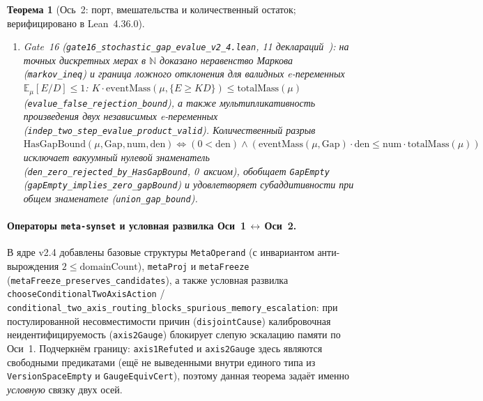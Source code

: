\documentclass[11pt,a4paper]{article}
\theoremstyle{preprintthm}
\newtheorem{theorem}{Теорема}[section]
\theoremstyle{preprintdef}
\begin{document}
\begin{theorem}[Ось~2: порт, вмешательства и количественный остаток; верифицировано в Lean~4.36.0]
\begin{enumerate}
  \item \emph{Gate~16 (\texttt{gate16\_\allowbreak stochastic\_\allowbreak gap\_\allowbreak evalue\_\allowbreak v2\_\allowbreak 4.lean}, 11 деклараций~\cite{strand2026g16}):} на точных дискретных мерах в $\mathbb{N}$ доказано неравенство Маркова (\texttt{markov\_\allowbreak ineq}) и граница ложного отклонения для валидных e-переменных $\mathbb{E}_\mu[E/D]\le 1$: $K\cdot\mathrm{eventMass}(\mu,\{E\ge KD\})\le\mathrm{totalMass}(\mu)$ (\texttt{evalue\_\allowbreak false\_\allowbreak rejection\_\allowbreak bound}), а также мультипликативность произведения двух независимых e-переменных (\texttt{indep\_\allowbreak two\_\allowbreak step\_\allowbreak evalue\_\allowbreak product\_\allowbreak valid}). Количественный разрыв $\mathrm{HasGapBound}(\mu,\mathrm{Gap},\mathrm{num},\mathrm{den}) \iff (0 < \mathrm{den}) \land (\mathrm{eventMass}(\mu,\mathrm{Gap})\cdot\mathrm{den} \le \mathrm{num}\cdot\mathrm{totalMass}(\mu))$ исключает вакуумный нулевой знаменатель (\texttt{den\_\allowbreak zero\_\allowbreak rejected\_\allowbreak by\_\allowbreak HasGapBound}, 0~аксиом), обобщает \texttt{GapEmpty} (\texttt{gapEmpty\_\allowbreak implies\_\allowbreak zero\_\allowbreak gapBound}) и удовлетворяет субаддитивности при общем знаменателе (\texttt{union\_\allowbreak gap\_\allowbreak bound}).
\end{enumerate}
\end{theorem}


\paragraph{Операторы \texttt{meta-synset} и условная развилка Оси~1\,$\leftrightarrow$\,Оси~2.}
В ядре v2.4 добавлены базовые структуры \texttt{MetaOperand} (с инвариантом анти-вырождения $2\le\mathrm{domainCount}$), \texttt{metaProj} и \texttt{metaFreeze} (\texttt{metaFreeze\_\allowbreak preserves\_\allowbreak candidates}), а также условная развилка \texttt{chooseConditionalTwoAxisAction} / \texttt{conditional\_\allowbreak two\_\allowbreak axis\_\allowbreak routing\_\allowbreak blocks\_\allowbreak spurious\_\allowbreak memory\_\allowbreak escalation}: при постулированной несовместимости причин (\texttt{disjointCause}) калибровочная неидентифицируемость (\texttt{axis2Gauge}) блокирует слепую эскалацию памяти по Оси~1. Подчеркнём границу: \texttt{axis1Refuted} и \texttt{axis2Gauge} здесь являются свободными предикатами (ещё не выведенными внутри единого типа из \texttt{VersionSpaceEmpty} и \texttt{GaugeEquivCert}), поэтому данная теорема задаёт именно \emph{условную} связку двух осей.
\end{document}

